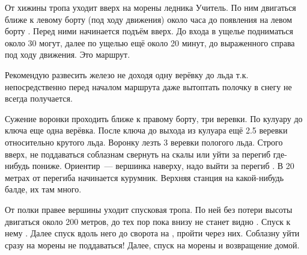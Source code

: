 От хижины \geoLighthouse тропа уходит вверх на морены ледника Учитель.
По ним двигаться ближе к левому борту (под ходу движения) около часа
до появления на левом борту . Перед ними начинается подъём вверх. До входа в ущелье
подниматься около 30 могут, далее по ущелью ещё около 20 минут, до
выраженного  справа под ходу движения. Это маршрут.

Рекомендую развесить железо не доходя одну верёвку до льда т.к.
непосредственно перед началом маршрута даже вытоптать полочку в снегу
не всегда получается.

Сужение воронки проходить ближе к правому борту, три веревки. По
кулуару до ключа еще одна верёвка.  После ключа до выхода из кулуара ещё
2.5 веревки относительно крутого льда. Воронку лезть 3 веревки
пологого льда. Строго вверх, не поддаваться соблазнам свернуть на
скалы или уйти за перегиб где-нибудь пониже. Ориентир~--- вершинка
наверху, надо выйти за перегиб
. В 20
метрах от перегиба начинается курумник. Верхняя станция на
какой-нибудь балде, их там много.

От полки правее вершины уходит спусковая тропа. По ней без потери
высоты двигаться около 200 метров, до тех пор пока внизу не станет
видно . Спуск к
нему . Далее спуск вдоль
него до сворота на \geoCampTomsk, пройти через них. Соблазну уйти
сразу на морены не поддаваться! Далее, спуск на морены и возвращение
домой.

